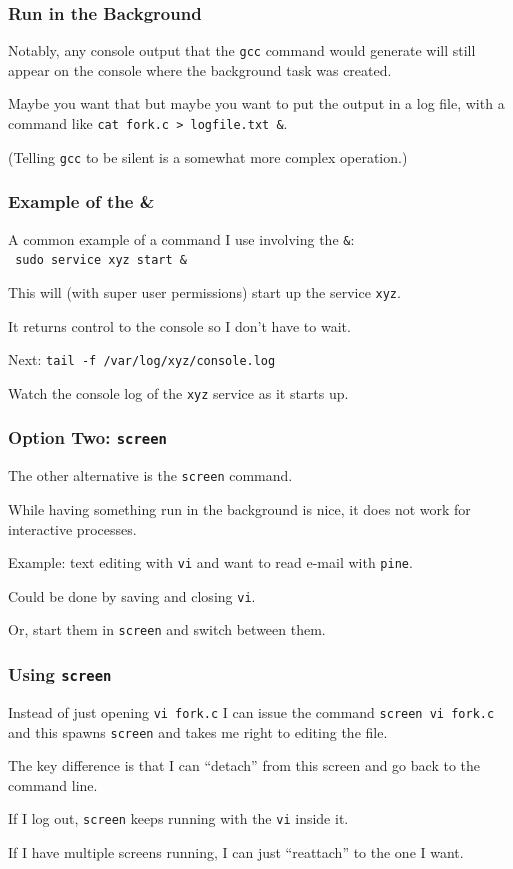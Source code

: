 \begin{frame}
\frametitle{Run in the Background}

Notably, any console output that the \texttt{gcc} command would generate will still appear on the console where the background task was created. 

Maybe you want that but maybe you want to put the output in a log file, with a command like \texttt{cat fork.c > logfile.txt \&}. 

(Telling \texttt{gcc} to be silent is a somewhat more complex operation.) 

\end{frame}

\begin{frame}
\frametitle{Example of the \&}

A common example of a command I use involving the \texttt{\&}:\\
\texttt{ sudo service xyz start \& }

This will (with super user permissions) start up the service \texttt{xyz}.
	
It returns control to the console so I don't have to wait.

Next: \texttt{tail -f /var/log/xyz/console.log}

Watch the console log of the \texttt{xyz} service as it starts up.

\end{frame}

\begin{frame}
\frametitle{Option Two: \texttt{screen}}

The other alternative is the \texttt{screen} command. 

While having something run in the background is nice, it does not work for interactive processes. 

Example: text editing with \texttt{vi} and want to read e-mail with \texttt{pine}.

Could be done by saving and closing \texttt{vi}.

Or, start them in \texttt{screen} and switch between them.

\end{frame}

\begin{frame}
\frametitle{Using \texttt{screen}}
Instead of just opening \texttt{vi fork.c} I can issue the command \texttt{screen vi fork.c} and this spawns \texttt{screen} and takes me right to editing the file. 

The key difference is that I can ``detach'' from this screen and go back to the command line.

If I log out, \texttt{screen} keeps running with the \texttt{vi} inside it.

 If I have multiple screens running, I can just ``reattach'' to the one I want.

\end{frame}

